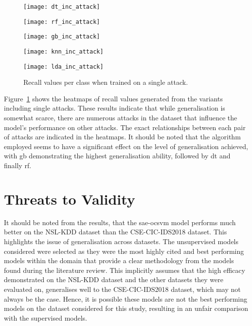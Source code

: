 \begin{figure}[htbp]
    \centering
    \begin{minipage}[h]{0.5\textwidth}
        \centering
        \texttt{[image: dt\_inc\_attack]}
    \end{minipage}\hfill
    \begin{minipage}[h]{0.5\textwidth}
        \centering
        \texttt{[image: rf\_inc\_attack]}
    \end{minipage}
    \begin{minipage}[h]{0.5\textwidth}
        \centering
        \texttt{[image: gb\_inc\_attack]}
    \end{minipage}\hfill
    \begin{minipage}[h]{0.5\textwidth}
        \centering
        \texttt{[image: knn\_inc\_attack]}
    \end{minipage}
    \begin{minipage}[h]{0.5\textwidth}
        \centering
        \texttt{[image: lda\_inc\_attack]}
    \end{minipage}
    \caption[Single Individual Attack Results]{Recall values per class when trained on a single attack.\label{fig:inc_att}}
\end{figure}
%

Figure~\ref{fig:inc_att} shows the heatmaps of recall values generated from the
variants including single attacks. These results indicate that while
generalisation is somewhat scarce, there are numerous attacks in the dataset
that influence the model's performance on other attacks. The exact
relationships between each pair of attacks are indicated in the heatmaps. It
should be noted that the algorithm employed seems to have a significant effect
on the level of generalisation achieved, with \gls{gb} demonstrating the
highest generalisation ability, followed by \gls{dt} and finally \gls{rf}.

\section{Threats to Validity}%
\label{sec:threats}
It should be noted from the results, that the \gls{sae}-\gls{ocsvm} model
performs much better on the NSL-KDD dataset than the CSE-CIC-IDS2018 dataset.
This highlights the issue of generalisation across datasets. The unsupervised
models considered were selected as they were the most highly cited and best
performing models within the domain that provide a clear methodology from the
models found during the literature review. This implicitly assumes that the
high efficacy demonstrated on the NSL-KDD dataset and the other datasets they
were evaluated on, generalises well to the CSE-CIC-IDS2018 dataset, which may
not always be the case. Hence, it is possible these models are not the best
performing models on the dataset considered for this study, resulting in an
unfair comparison with the supervised models.

